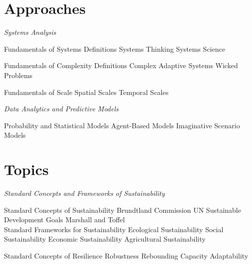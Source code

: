 \documentclass[12pt, letterpaper]{article}
\begin{document}
\section{Approaches}

\large
\begin{flushleft}
\textit{Systems Analysis}
\end{flushleft}

\normalsize

\begin{outline}[enumerate]
\1 Fundamentals of Systems
\2 Definitions
\2 Systems Thinking
\2 Systems Science

\1 Fundamentals of Complexity
\2 Definitions
\2 Complex Adaptive Systems
\2 Wicked Problems

\1 Fundamentals of Scale 
\2 Spatial Scales
\2 Temporal Scales
\end{outline}


\large
\begin{flushleft}
\textit{Data Analytics and Predictive Models}
\end{flushleft}

\normalsize
\begin{outline}[enumerate]
\1 Probability and Statistical Models
\1 Agent-Based Models
\1 Imaginative Scenario Models
\end{outline}


\section{Topics}

\large
\begin{flushleft}
\textit{Standard Concepts and Frameworks of Sustainability}
\end{flushleft}

\normalsize

\begin{outline}[enumerate]
\1 Standard Concepts of Sustainability
\2 Brundtland Commission
\2 UN Sustainable Development Goals
\2 Marshall and Toffel\\

\1 Standard Frameworks for Sustainability 
\2 Ecological Sustainability
\2 Social Sustainability
\2 Economic Sustainability
\2 Agricultural Sustainability

\1 Standard Concepts of Resilience
\2 Robustness
\2 Rebounding Capacity
\2 Adaptability
\end{outline}
\end{document}
